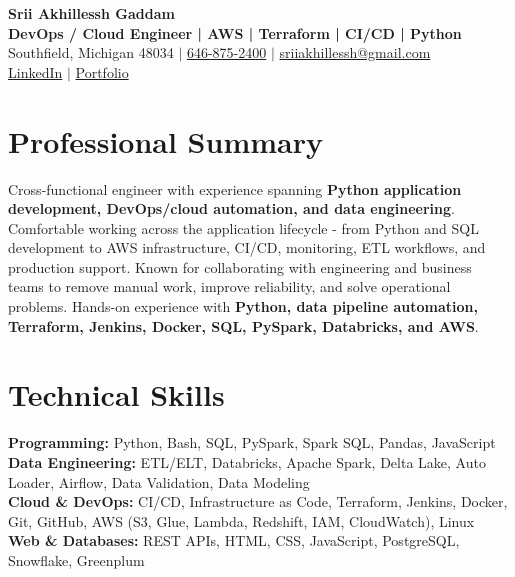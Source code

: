 \documentclass[letterpaper,10pt]{article}
\begin{document}
\fontsize{9.35pt}{10.45pt}\selectfont

\begin{center}
    {\LARGE \textbf{Srii Akhillessh Gaddam}} \\[-1pt]
    \textbf{DevOps / Cloud Engineer | AWS | Terraform | CI/CD | Python} \\[2pt]
    Southfield, Michigan 48034 $|$
    \href{tel:6468752400}{646-875-2400} $|$
    \href{mailto:sriiakhillessh@gmail.com}{sriiakhillessh@gmail.com} \\[1pt]
    \href{https://www.linkedin.com/in/srii-akhiilessh-gaddam-b48668191/}{LinkedIn} $|$
    \href{https://sriiakhillesshg.github.io/portfolio/}{Portfolio}
\end{center}
\vspace{-8pt}

\section{Professional Summary}
\small{Cross-functional engineer with experience spanning \textbf{Python application development, DevOps/cloud automation, and data engineering}. Comfortable working across the application lifecycle - from Python and SQL development to AWS infrastructure, CI/CD, monitoring, ETL workflows, and production support. Known for collaborating with engineering and business teams to remove manual work, improve reliability, and solve operational problems. Hands-on experience with \textbf{Python, data pipeline automation, Terraform, Jenkins, Docker, SQL, PySpark, Databricks, and AWS}.}

\section{Technical Skills}
\small{
\textbf{Programming:} Python, Bash, SQL, PySpark, Spark SQL, Pandas, JavaScript \\
\textbf{Data Engineering:} ETL/ELT, Databricks, Apache Spark, Delta Lake, Auto Loader, Airflow, Data Validation, Data Modeling \\
\textbf{Cloud \& DevOps:} CI/CD, Infrastructure as Code, Terraform, Jenkins, Docker, Git, GitHub, AWS (S3, Glue, Lambda, Redshift, IAM, CloudWatch), Linux \\
\textbf{Web \& Databases:} REST APIs, HTML, CSS, JavaScript, PostgreSQL, Snowflake, Greenplum
}
\end{document}
